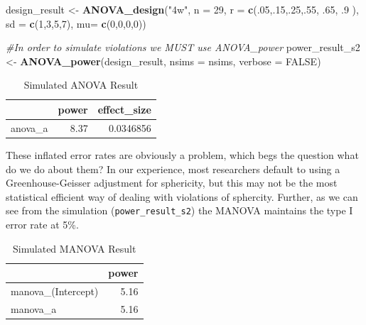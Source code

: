 \documentclass[
]{book}
\newenvironment{Shaded}{\begin{snugshade}}{\end{snugshade}}
\newcommand{\CommentTok}[1]{\textcolor[rgb]{0.56,0.35,0.01}{\textit{#1}}}
\newcommand{\DataTypeTok}[1]{\textcolor[rgb]{0.13,0.29,0.53}{#1}}
\newcommand{\DecValTok}[1]{\textcolor[rgb]{0.00,0.00,0.81}{#1}}
\newcommand{\FloatTok}[1]{\textcolor[rgb]{0.00,0.00,0.81}{#1}}
\newcommand{\KeywordTok}[1]{\textcolor[rgb]{0.13,0.29,0.53}{\textbf{#1}}}
\newcommand{\NormalTok}[1]{#1}
\newcommand{\OtherTok}[1]{\textcolor[rgb]{0.56,0.35,0.01}{#1}}
\newcommand{\StringTok}[1]{\textcolor[rgb]{0.31,0.60,0.02}{#1}}
\begin{document}
\begin{Shaded}
\begin{Highlighting}[]
\NormalTok{design_result <-}\StringTok{ }\KeywordTok{ANOVA_design}\NormalTok{(}\StringTok{"4w"}\NormalTok{,}
                              \DataTypeTok{n =} \DecValTok{29}\NormalTok{,}
                              \DataTypeTok{r =} \KeywordTok{c}\NormalTok{(.}\DecValTok{05}\NormalTok{,.}\DecValTok{15}\NormalTok{,.}\DecValTok{25}\NormalTok{,.}\DecValTok{55}\NormalTok{, }\FloatTok{.65}\NormalTok{, }\FloatTok{.9}
\NormalTok{                                    ),}
                              \DataTypeTok{sd =} \KeywordTok{c}\NormalTok{(}\DecValTok{1}\NormalTok{,}\DecValTok{3}\NormalTok{,}\DecValTok{5}\NormalTok{,}\DecValTok{7}\NormalTok{),}
                              \DataTypeTok{mu=} \KeywordTok{c}\NormalTok{(}\DecValTok{0}\NormalTok{,}\DecValTok{0}\NormalTok{,}\DecValTok{0}\NormalTok{,}\DecValTok{0}\NormalTok{))}

\CommentTok{#In order to simulate violations we MUST use ANOVA_power}
\NormalTok{power_result_s2 <-}\StringTok{ }\KeywordTok{ANOVA_power}\NormalTok{(design_result, }\DataTypeTok{nsims =}\NormalTok{ nsims, }\DataTypeTok{verbose =} \OtherTok{FALSE}\NormalTok{)}
\end{Highlighting}
\end{Shaded}

\begin{table}[!h]

\caption{\label{tab:unnamed-chunk-131}Simulated ANOVA Result}
\centering
\begin{tabular}[t]{l|r|r}
\hline
  & power & effect\_size\\
\hline
anova\_a & 8.37 & 0.0346856\\
\hline
\end{tabular}
\end{table}

These inflated error rates are obviously a problem, which begs the question what do we do about them?
\newpage
In our experience, most researchers default to using a Greenhouse-Geisser adjustment for sphericity, but this may not be the most statistical efficient way of dealing with violations of sphercity. Further, as we can see from the simulation (\texttt{power\_result\_s2}) the MANOVA maintains the type I error rate at 5\%.

\begin{table}[!h]

\caption{\label{tab:unnamed-chunk-132}Simulated MANOVA Result}
\centering
\begin{tabular}[t]{l|r}
\hline
  & power\\
\hline
manova\_(Intercept) & 5.16\\
\hline
manova\_a & 5.16\\
\hline
\end{tabular}
\end{table}
\newpage
\end{document}
